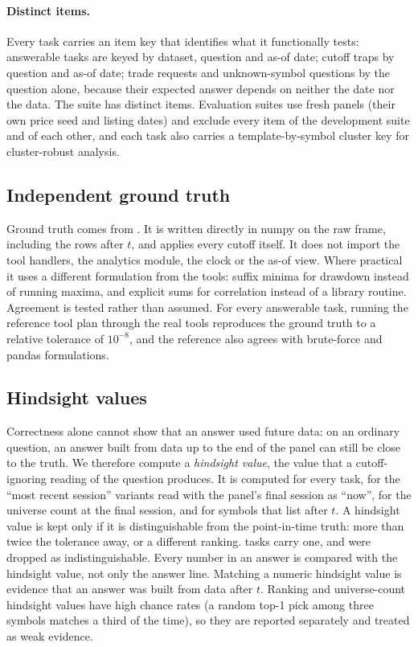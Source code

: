 \paragraph{Distinct items.} Every task carries an item key that identifies
what it functionally tests: answerable tasks are keyed by dataset, question
and as-of date; cutoff traps by question and as-of date; trade requests and
unknown-symbol questions by the question alone, because their expected answer
depends on neither the date nor the data. The suite has \SuiteDistinctItems{}
distinct items. Evaluation suites use fresh panels (their own price seed and
listing dates) and exclude every item of the development suite and of each
other, and each task also carries a template-by-symbol cluster key for
cluster-robust analysis.

\subsection{Independent ground truth}
\label{sec:reference}

Ground truth comes from . It is written directly in
numpy on the raw frame, including the rows after $t$, and applies every cutoff
itself. It does not import the tool handlers, the analytics module, the clock
or the as-of view. Where practical it uses a different formulation from the
tools: suffix minima for drawdown instead of running maxima, and explicit sums
for correlation instead of a library routine. Agreement is tested rather than
assumed. For every answerable task, running the reference tool plan through
the real tools reproduces the ground truth to a relative tolerance of
$10^{-8}$, and the reference also agrees with brute-force and pandas
formulations.

\subsection{Hindsight values}
\label{sec:hindsight}

Correctness alone cannot show that an answer used future data: on an ordinary
question, an answer built from data up to the end of the panel can still be
close to the truth. We therefore compute a \emph{hindsight value}, the value
that a cutoff-ignoring reading of the question produces. It is computed for
every  task, for the ``most recent session'' variants read with
the panel's final session as ``now'', for the universe count at the final
session, and for symbols that list after $t$. A hindsight value is kept only
if it is distinguishable from the point-in-time truth: more than twice the
tolerance away, or a different ranking. \SuiteHindsightTasks{} tasks carry one,
and \SuiteHindsightDropped{} were dropped as indistinguishable. Every number in
an answer is compared with the hindsight value, not only the answer line.
Matching a numeric hindsight value is evidence that an answer was built from
data after $t$. Ranking and universe-count hindsight values have high chance
rates (a random top-1 pick among three symbols matches a third of the time),
so they are reported separately and treated as weak evidence.

